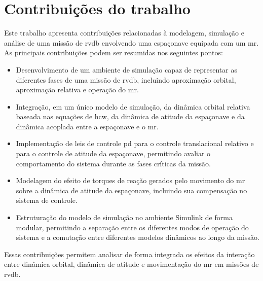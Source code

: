 \section{Contribuições do trabalho}

Este trabalho apresenta contribuições relacionadas à modelagem, simulação e análise de uma missão de \gls{rvdb} envolvendo uma espaçonave equipada com um \gls{mr}. 
As principais contribuições podem ser resumidas nos seguintes pontos:

\begin{itemize}

\item Desenvolvimento de um ambiente de simulação capaz de representar as diferentes fases de uma missão de \gls{rvdb}, incluindo aproximação orbital, aproximação relativa e operação do \gls{mr}.

\item Integração, em um único modelo de simulação, da dinâmica orbital relativa baseada nas equações de \gls{hcw}, da dinâmica de atitude da espaçonave e da dinâmica acoplada entre a espaçonave e o \gls{mr}.

\item Implementação de leis de controle \gls{pd} para o controle translacional relativo e para o controle de atitude da espaçonave, permitindo avaliar o comportamento do sistema durante as fases críticas da missão.

\item Modelagem do efeito de torques de reação gerados pelo movimento do \gls{mr} sobre a dinâmica de atitude da espaçonave, incluindo sua compensação no sistema de controle.

\item Estruturação do modelo de simulação no ambiente Simulink de forma modular, permitindo a separação entre os diferentes modos de operação do sistema e a comutação entre diferentes modelos dinâmicos ao longo da missão.

\end{itemize}

Essas contribuições permitem analisar de forma integrada os efeitos da interação entre dinâmica orbital, dinâmica de atitude e movimentação do \gls{mr} em missões de \gls{rvdb}.